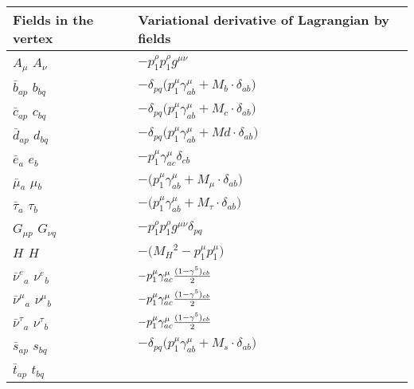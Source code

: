 \textwidth 17cm
\textheight 25cm
\hoffset -3cm
\voffset -1cm
\pagestyle{empty}

\begin{center}

\begin{tabular}{|l|l|} \hline
Fields in the vertex & Variational derivative of Lagrangian by fields \\ \hline
${A}_{\mu }$ \phantom{-} ${A}_{\nu }$ \phantom{-}  &
	$-p_1^\rho p_1^\rho g^{\mu \nu} $\\[2mm]
$\bar{b}{}_{a p }$ \phantom{-} $b{}_{b q }$ \phantom{-}  &
	$-\delta_{p q} \big(p_1^\mu \gamma_{a b}^\mu + M_b\cdot \delta_{a b} \big)$\\[2mm]
$\bar{c}{}_{a p }$ \phantom{-} $c{}_{b q }$ \phantom{-}  &
	$-\delta_{p q} \big(p_1^\mu \gamma_{a b}^\mu + M_c\cdot \delta_{a b} \big)$\\[2mm]
$\bar{d}{}_{a p }$ \phantom{-} $d{}_{b q }$ \phantom{-}  &
	$-\delta_{p q} \big(p_1^\mu \gamma_{a b}^\mu + Md\cdot \delta_{a b} \big)$\\[2mm]
$\bar{e}{}_{a }$ \phantom{-} $e{}_{b }$ \phantom{-}  &
	$-p_1^\mu \gamma_{a c}^\mu \delta_{c b} $\\[2mm]
$\bar{\mu}{}_{a }$ \phantom{-} $\mu{}_{b }$ \phantom{-}  &
	$-\big(p_1^\mu \gamma_{a b}^\mu + M_{\mu}\cdot \delta_{a b} \big)$\\[2mm]
$\bar{\tau}{}_{a }$ \phantom{-} $\tau{}_{b }$ \phantom{-}  &
	$-\big(p_1^\mu \gamma_{a b}^\mu + M_{\tau}\cdot \delta_{a b} \big)$\\[2mm]
${G}_{\mu p }$ \phantom{-} ${G}_{\nu q }$ \phantom{-}  &
	$-p_1^\rho p_1^\rho g^{\mu \nu} \delta_{p q} $\\[2mm]
${H}_{}$ \phantom{-} ${H}_{}$ \phantom{-}  &
	$-\big( M_H{}^2 -p_1^\mu p_1^\mu \big)$\\[2mm]
$\bar{\nu}^e{}_{a }$ \phantom{-} $\nu^e{}_{b }$ \phantom{-}  &
	$-p_1^\mu \gamma_{a c}^\mu {(1-\gamma^5)_{c b}\over 2} $\\[2mm]
$\bar{\nu}^\mu{}_{a }$ \phantom{-} $\nu^\mu{}_{b }$ \phantom{-}  &
	$-p_1^\mu \gamma_{a c}^\mu {(1-\gamma^5)_{c b}\over 2} $\\[2mm]
$\bar{\nu}^\tau{}_{a }$ \phantom{-} $\nu^\tau{}_{b }$ \phantom{-}  &
	$-p_1^\mu \gamma_{a c}^\mu {(1-\gamma^5)_{c b}\over 2} $\\[2mm]
$\bar{s}{}_{a p }$ \phantom{-} $s{}_{b q }$ \phantom{-}  &
	$-\delta_{p q} \big(p_1^\mu \gamma_{a b}^\mu + M_s\cdot \delta_{a b} \big)$\\[2mm]
$\bar{t}{}_{a p }$ \phantom{-} $t{}_{b q }$ \phantom{-}  &

\end{tabular}
\end{center}
